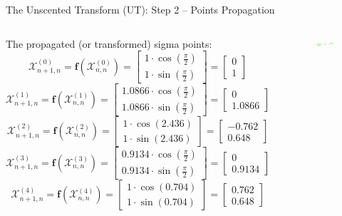 \begin{frame}{The Unscented Transform (UT): Step 2 – Points Propagation}
\begin{columns}
The propagated (or transformed) sigma points:
\[
\mathbf{\mathcal{X}}^{(0)}_{n+1,n} = \mathbf{f}(\mathbf{\mathcal{X}}^{(0)}_{n,n}) =
\begin{bmatrix}
1 \cdot \cos\left(\frac{\pi}{2}\right) \\
1 \cdot \sin\left(\frac{\pi}{2}\right)
\end{bmatrix}
\!=\!
\begin{bmatrix}
0 \\
1
\end{bmatrix}
\]
\[
\mathbf{\mathcal{X}}^{(1)}_{n+1,n} \!=\! \mathbf{f}(\mathbf{\mathcal{X}}^{(1)}_{n,n}) \!=\!
\begin{bmatrix}
1.0866 \cdot \cos\left(\frac{\pi}{2}\right) \\
1.0866 \cdot \sin\left(\frac{\pi}{2}\right)
\end{bmatrix}
\!=\!
\begin{bmatrix}
0 \\
1.0866
\end{bmatrix}
\]
\[
\mathbf{\mathcal{X}}^{(2)}_{n+1,n} \!=\! \mathbf{f}(\mathbf{\mathcal{X}}^{(2)}_{n,n}) \!=\!
\begin{bmatrix}
1 \cdot \cos(2.436) \\
1 \cdot \sin(2.436)
\end{bmatrix}
\!=\!
\begin{bmatrix}
-0.762 \\
0.648
\end{bmatrix}
\]
\[
\mathbf{\mathcal{X}}^{(3)}_{n+1,n} \!=\! \mathbf{f}(\mathbf{\mathcal{X}}^{(3)}_{n,n}) \!=\!
\begin{bmatrix}
0.9134 \cdot \cos\left(\frac{\pi}{2}\right) \\
0.9134 \cdot \sin\left(\frac{\pi}{2}\right)
\end{bmatrix}
\!=\!
\begin{bmatrix}
0 \\
0.9134
\end{bmatrix}
\]
\[
\mathbf{\mathcal{X}}^{(4)}_{n+1,n} \!=\! \mathbf{f}(\mathbf{\mathcal{X}}^{(4)}_{n,n}) \!=\!
\begin{bmatrix}
1 \cdot \cos(0.704) \\
1 \cdot \sin(0.704)
\end{bmatrix}
\!=\!
\begin{bmatrix}
0.762 \\
0.648
\end{bmatrix}
\]
\begin{figure}
    \centering
    \includegraphics[width=0.95\linewidth]{Figures//Part3/2DSigmaPointsPropagation.png}

\end{figure}
\end{columns}
\end{frame}
